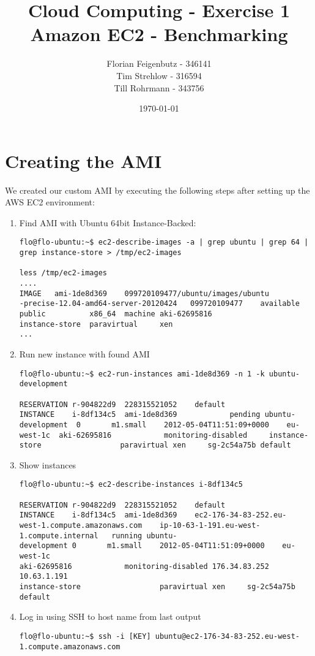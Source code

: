 \documentclass{article}
\title{Cloud Computing - Exercise 1\\
Amazon EC2 - Benchmarking}
\author{Florian Feigenbutz - 346141\\
Tim Strehlow - 316594\\
Till Rohrmann - 343756}
\date{\today}
\begin{document}


\maketitle

\setcounter{section}{1}
\section{Creating the AMI}
We created our custom AMI by executing the following steps after setting up the AWS EC2 environment:
\begin{enumerate}
	\item Find AMI with Ubuntu 64bit Instance-Backed:
\begin{verbatim}
flo@flo-ubuntu:~$ ec2-describe-images -a | grep ubuntu | grep 64 | 
grep instance-store > /tmp/ec2-images

less /tmp/ec2-images
....
IMAGE   ami-1de8d369    099720109477/ubuntu/images/ubuntu
-precise-12.04-amd64-server-20120424   099720109477    available       
public          x86_64  machine aki-62695816                    
instance-store  paravirtual     xen
...
\end{verbatim}
	\item Run new instance with found AMI
\begin{verbatim}
flo@flo-ubuntu:~$ ec2-run-instances ami-1de8d369 -n 1 -k ubuntu-development

RESERVATION	r-904822d9	228315521052	default
INSTANCE	i-8df134c5	ami-1de8d369			pending	ubuntu-development	0		m1.small	2012-05-04T11:51:09+0000	eu-west-1c	aki-62695816			monitoring-disabled		instance-store					paravirtual	xen		sg-2c54a75b	default
\end{verbatim}

	\item Show instances
\begin{verbatim}
flo@flo-ubuntu:~$ ec2-describe-instances i-8df134c5

RESERVATION	r-904822d9	228315521052	default
INSTANCE	i-8df134c5	ami-1de8d369	ec2-176-34-83-252.eu-
west-1.compute.amazonaws.com	ip-10-63-1-191.eu-west-1.compute.internal	running	ubuntu-
development	0		m1.small	2012-05-04T11:51:09+0000	eu-west-1c	
aki-62695816			monitoring-disabled	176.34.83.252	10.63.1.191		
instance-store					paravirtual	xen		sg-2c54a75b	
default
\end{verbatim}

	\item Log in using SSH to host name from last output
\begin{verbatim}
flo@flo-ubuntu:~$ ssh -i [KEY] ubuntu@ec2-176-34-83-252.eu-west-
1.compute.amazonaws.com
\end{verbatim}


\end{enumerate}
\end{document}
